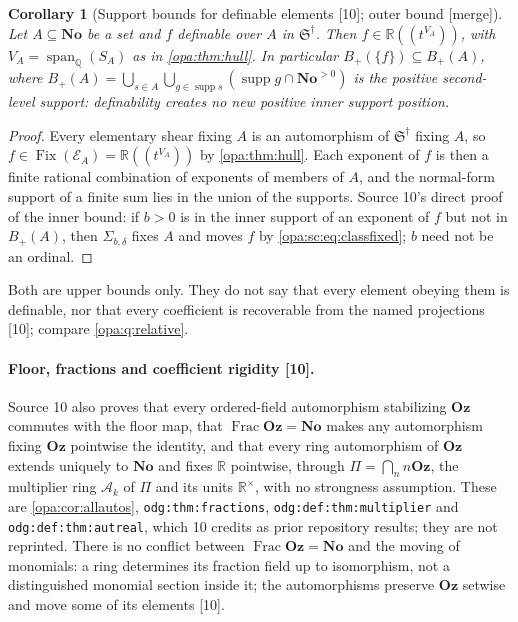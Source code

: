 \documentclass[11pt,oneside]{article}
\numberwithin{equation}{section}
\newtheorem{corollary}[corollary]{Corollary}
\theoremstyle{definition}
\theoremstyle{remark}
\newcommand{\No}{\mathbf{No}}
\newcommand{\Oz}{\mathbf{Oz}}
\newcommand{\R}{\mathbb R}
\newcommand{\Q}{\mathbb Q}
\newcommand{\Ak}{\mathcal A_k}
\newcommand{\EE}{\mathcal E}
\newcommand{\supp}{\operatorname{supp}}
\newcommand{\Fix}{\operatorname{Fix}}
\newcommand{\Frac}{\operatorname{Frac}}
\newcommand{\Span}{\operatorname{span}_{\Q}}
\newcommand{\Hahn}[2]{#1((t^{#2}))}
\newcommand{\src}[1]{\textup{\textsf{\small[#1]}}}
\newcommand{\mergetag}{\textup{\textsf{\small[merge]}}}
\newcommand{\lbl}[1]{\nolinkurl{#1}}
\begin{document}
\begin{corollary}[Support bounds for definable elements \src{10}; outer bound \mergetag]\label{opa:sc:cor:innerbound}
Let $A\subseteq\No$ be a set and $f$ definable over $A$ in $\mathfrak S^\dagger$. Then
$f\in\Hahn\R{V_A}$, with $V_A=\Span(S_A)$ as in \cref{opa:thm:hull}. In
particular $B_+(\{f\})\subseteq B_+(A)$, where
$B_+(A)=\bigcup_{s\in A}\bigcup_{g\in\supp s}(\supp g\cap\No^{>0})$ is the
positive second-level support: definability creates no new positive inner
support position.
\end{corollary}
\begin{proof}
Every elementary shear fixing $A$ is an automorphism of $\mathfrak S^\dagger$ fixing
$A$, so $f\in\Fix(\EE_A)=\Hahn\R{V_A}$ by \cref{opa:thm:hull}. Each exponent of
$f$ is then a finite rational combination of exponents of members of $A$, and
the normal-form support of a finite sum lies in the union of the supports.
Source 10's direct proof of the inner bound: if $b>0$ is in the inner support of
an exponent of $f$ but not in $B_+(A)$, then $\Sigma_{b,\delta}$ fixes $A$ and moves
$f$ by \eqref{opa:sc:eq:classfixed}; $b$ need not be an ordinal.
\end{proof}

Both are upper bounds only. They do not say that every element obeying them is
definable, nor that every coefficient is recoverable from the named projections
\src{10}; compare \cref{opa:q:relative}.

\paragraph{Floor, fractions and coefficient rigidity \src{10}.} Source 10 also
proves that every ordered-field automorphism stabilizing $\Oz$ commutes with the
floor map, that $\Frac\Oz=\No$ makes any automorphism fixing $\Oz$ pointwise the
identity, and that every ring automorphism of $\Oz$ extends uniquely to $\No$ and
fixes $\R$ pointwise, through $\Pi=\bigcap_nn\Oz$, the multiplier ring $\Ak$ of
$\Pi$ and its units $\R^\times$, with no strongness assumption. These are
\cref{opa:cor:allautos}, \lbl{odg:thm:fractions}, \lbl{odg:def:thm:multiplier}
and \lbl{odg:def:thm:autreal}, which 10 credits as prior repository results;
they are not reprinted. There is no conflict between $\Frac\Oz=\No$ and the
moving of monomials: a ring determines its fraction field up to isomorphism,
not a distinguished monomial section inside it; the automorphisms preserve
$\Oz$ setwise and move some of its elements \src{10}.
\end{document}
